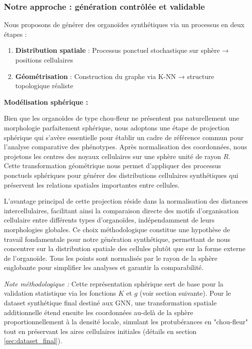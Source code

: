 \subsubsection{Notre approche : génération contrôlée et validable}

Nous proposons de générer des organoïdes synthétiques via un processus en deux étapes :
\begin{enumerate}
    \item \textbf{Distribution spatiale} : Processus ponctuel stochastique sur sphère → positions cellulaires
    \item \textbf{Géométrisation} : Construction du graphe via K-NN → structure topologique réaliste
\end{enumerate}

\textbf{Modélisation sphérique :}

Bien que les organoïdes de type chou-fleur ne présentent pas naturellement une morphologie parfaitement sphérique, nous adoptons une étape de projection sphérique qui s'avère essentielle pour établir un cadre de référence commun pour l'analyse comparative des phénotypes. Après normalisation des coordonnées, nous projetons les centres des noyaux cellulaires sur une sphère unité de rayon $R$. Cette transformation géométrique nous permet d'appliquer des processus ponctuels sphériques pour générer des distributions cellulaires synthétiques qui préservent les relations spatiales importantes entre cellules.

L'avantage principal de cette projection réside dans la normalisation des distances intercellulaires, facilitant ainsi la comparaison directe des motifs d'organisation cellulaire entre différents types d'organoïdes, indépendamment de leurs morphologies globales. Ce choix méthodologique constitue une hypothèse de travail fondamentale pour notre génération synthétique, permettant de nous concentrer sur la distribution spatiale des cellules plutôt que sur la forme externe de l'organoïde. Tous les points sont normalisés par le rayon de la sphère englobante pour simplifier les analyses et garantir la comparabilité.

\textit{Note méthodologique :} Cette représentation sphérique sert de base pour la validation statistique via les fonctions $K$ et $g$ (voir section suivante). Pour le dataset synthétique final destiné aux GNN, une transformation spatiale additionnelle étend ensuite les coordonnées au-delà de la sphère proportionnellement à la densité locale, simulant les protubérances en "chou-fleur" tout en préservant les aires cellulaires initiales (détails en section \ref{sec:dataset_final}).

